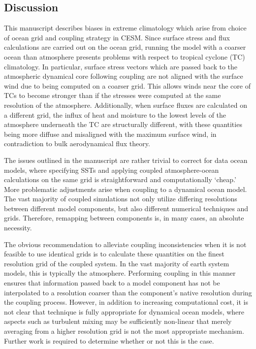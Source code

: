 \documentclass[draft,ms]{AGUTeX}
\begin{document}
\begin{article}
\section{Discussion}
\label{sec:discussion}

This manuscript describes biases in extreme climatology which arise from choice of ocean grid and coupling strategy in CESM. Since surface stress and flux calculations are carried out on the ocean grid, running the model with a coarser ocean than atmosphere presents problems with respect to tropical cyclone (TC) climatology. In particular, surface stress vectors which are passed back to the atmospheric dynamical core following coupling are not aligned with the surface wind due to being computed on a coarser grid. This allows winds near the core of TCs to become stronger than if the stresses were computed at the same resolution of the atmosphere. Additionally, when surface fluxes are calculated on a different grid, the influx of heat and moisture to the lowest levels of the atmosphere underneath the TC are structurally different, with these quantities being more diffuse and misaligned with the maximum surface wind, in contradiction to bulk aerodynamical flux theory.

The issues outlined in the manuscript are rather trivial to correct for data ocean models, where specifying SSTs and applying coupled atmosphere-ocean calculations on the same grid is straightforward and computationally `cheap.' More problematic adjustments arise when coupling to a dynamical ocean model. The vast majority of coupled simulations not only utilize differing resolutions between different model components, but also different numerical techniques and grids. Therefore, remapping between components is, in many cases, an absolute necessity.

The obvious recommendation to alleviate coupling inconsistencies when it is not feasible to use identical grids is to calculate these quantities on the finest resolution grid of the coupled system. In the vast majority of earth system models, this is typically the atmosphere. Performing coupling in this manner ensures that information passed back to a model component has not be interpolated to a resolution coarser than the component's native resolution during the coupling process. However, in addition to increasing computational cost, it is not clear that technique is fully appropriate for dynamical ocean models, where aspects such as turbulent mixing may be sufficiently non-linear that merely averaging from a higher resolution grid is not the most appropriate mechanism. Further work is required to determine whether or not this is the case.


\end{article}
\end{document}
